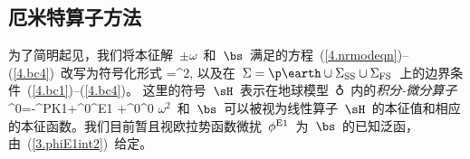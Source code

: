 \subsection{厄米特算子方法}
%
%
%
%
\label{4.sec.nrHerm}

为了简明起见，我们将本征解~$\pm\omega$~和~$\bs$~满足的方程~(\ref{4.nrmodeqn})--(\ref{4.bc4})~改写为符号化形式
\eq
\label{4.Vswsqs}
\sH\bs=\omega^2\bs,
\en
以及在~$\Sigma=\p\earth\cup\Sigma_{\rm SS}\cup\Sigma_{\rm FS}$~上的边界条件~(\ref{4.bc1})--(\ref{4.bc4})。
这里的符号~$\sH$~表示在地球模型~$\earth$~内的{\em 积分-微分算子\/}
%
%
\eq
\label{4.Vopdef}
\rho^0\sH\bs=-\bdel\cdot\bT^{\rm PK1}+\rho^0\bdel\phi^{\rm E1}
+\rho^0\bs\cdot\bdel\bdel\phi^0
\en
$\omega^2$~和~$\bs$~可以被视为线性算子~$\sH$~的本征值和相应的本征函数。我们目前暂且视欧拉势函数微扰~$\phi^{\rm E1}$~为~$\bs$~的已知泛函，由~(\ref{3.phiE1int2})~给定。

